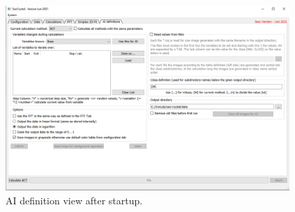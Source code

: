 \documentclass[11pt]{article} %
\begin{document}
\begin{figure}[H]
 \centering
 \includegraphics[width=0.96\textwidth]{main-aidef-start.png}
 \caption{AI definition view after startup.}
 \label{fig:aistart}
\end{figure}
\end{document}
